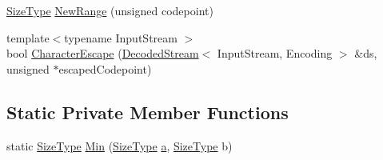 \begin{DoxyCompactItemize}
\item 
\hyperlink{rapidjson_8h_a5ed6e6e67250fadbd041127e6386dcb5}{Size\+Type} \hyperlink{classinternal_1_1GenericRegex_a868d6e44d0782e9fbdd476243daa578f}{New\+Range} (unsigned codepoint)
\item 
{\footnotesize template$<$typename Input\+Stream $>$ }\\bool \hyperlink{classinternal_1_1GenericRegex_ae46593a63a93b8bc34d044800777b72d}{Character\+Escape} (\hyperlink{classinternal_1_1DecodedStream}{Decoded\+Stream}$<$ Input\+Stream, Encoding $>$ \&ds, unsigned $\ast$escaped\+Codepoint)
\end{DoxyCompactItemize}
\subsection*{Static Private Member Functions}
\begin{DoxyCompactItemize}
\item 
static \hyperlink{rapidjson_8h_a5ed6e6e67250fadbd041127e6386dcb5}{Size\+Type} \hyperlink{classinternal_1_1GenericRegex_a064e15b8c9c222a07e143ec5847c6ec6}{Min} (\hyperlink{rapidjson_8h_a5ed6e6e67250fadbd041127e6386dcb5}{Size\+Type} \hyperlink{pointer_8h_aeeddce917cf130d62c370b8f216026dd}{a}, \hyperlink{rapidjson_8h_a5ed6e6e67250fadbd041127e6386dcb5}{Size\+Type} b)
\end{DoxyCompactItemize}
